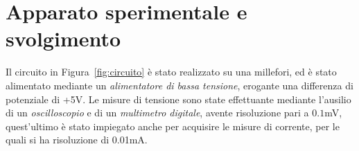 \documentclass[@MAIN@]{subfiles}
\begin{document}
\section{Apparato sperimentale e svolgimento} \label{sec:acquisizione}
  Il circuito in Figura~\ref{fig:circuito} è stato realizzato su una millefori, ed è stato alimentato mediante un \textit{alimentatore di bassa tensione}, erogante una differenza di potenziale di +5V. 
  Le misure di tensione sono state effettuante mediante l'ausilio di un \textit{oscilloscopio} e di un \textit{multimetro digitale}, avente risoluzione pari a $0.1$mV, quest'ultimo è stato
  impiegato anche per acquisire le misure di corrente, per le quali si ha risoluzione di 0.01mA.
  \\ \\
  
  \\
  \begin{center}
    
  \end{center}

  \begin{minipage}{.45\textwidth}
    
  \end{minipage}
  \hfill
  \begin{minipage}{.45\textwidth}
    
  \end{minipage}
\end{document}
